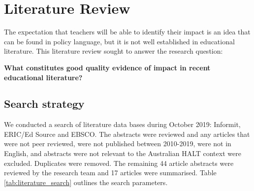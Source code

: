\chapter{Literature Review}
\label{chapter:litreview}

The expectation that teachers will be able to identify their impact is an idea that can be found in policy language, but it is not well established in educational literature. This literature review sought to answer the research question:

\textbf{What constitutes good quality evidence of impact in recent educational literature?}

\section{Search strategy}

We conducted a search of literature data bases during October 2019: Informit, ERIC/Ed Source and EBSCO. The abstracts were reviewed and any articles that were not peer reviewed, were not published between 2010-2019, were not in English, and abstracts were not relevant to the Australian HALT context were excluded. Duplicates were removed. The remaining 44 article abstracts were reviewed by the research team and 17 articles were summarised. Table \ref{tab:literature_search} outlines the search parameters.


